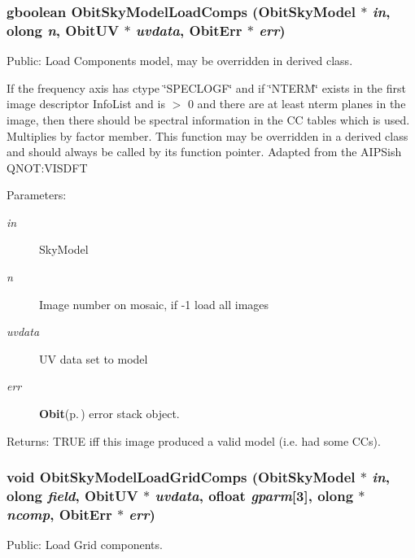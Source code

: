 \subsubsection{\setlength{\rightskip}{0pt plus 5cm}gboolean Obit\-Sky\-Model\-Load\-Comps ({\bf Obit\-Sky\-Model} $\ast$ {\em in}, {\bf olong} {\em n}, {\bf Obit\-UV} $\ast$ {\em uvdata}, {\bf Obit\-Err} $\ast$ {\em err})}\label{ObitSkyModel_8h_a62}


Public: Load Components model, may be overridden in derived class. 

If the frequency axis has ctype \char`\"{}SPECLOGF\char`\"{} and if \char`\"{}NTERM\char`\"{} exists in the first image descriptor Info\-List and is $>$ 0 and there are at least nterm planes in the image, then there should be spectral information in the CC tables which is used. Multiplies by factor member. This function may be overridden in a derived class and should always be called by its function pointer. Adapted from the AIPSish QNOT:VISDFT \begin{Desc}
\item[Parameters:]
\begin{description}
\item[{\em in}]Sky\-Model \item[{\em n}]Image number on mosaic, if -1 load all images \item[{\em uvdata}]UV data set to model \item[{\em err}]{\bf Obit}{\rm (p.\,\pageref{structObit})} error stack object. \end{description}
\end{Desc}
\begin{Desc}
\item[Returns:]TRUE iff this image produced a valid model (i.e. had some CCs). \end{Desc}
\subsubsection{\setlength{\rightskip}{0pt plus 5cm}void Obit\-Sky\-Model\-Load\-Grid\-Comps ({\bf Obit\-Sky\-Model} $\ast$ {\em in}, {\bf olong} {\em field}, {\bf Obit\-UV} $\ast$ {\em uvdata}, {\bf ofloat} {\em gparm}[3], {\bf olong} $\ast$ {\em ncomp}, {\bf Obit\-Err} $\ast$ {\em err})}\label{ObitSkyModel_8h_a76}


Public: Load Grid components. 

